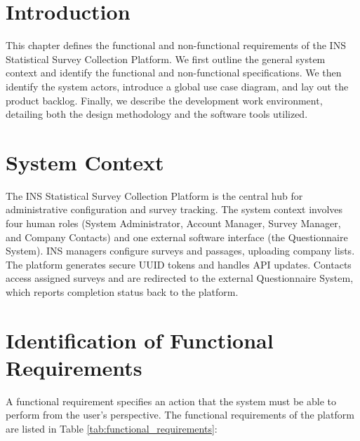 \documentclass[12pt,a4paper]{report}
\begin{document}
\section{Introduction}
This chapter defines the functional and non-functional requirements of the INS Statistical Survey Collection Platform. We first outline the general system context and identify the functional and non-functional specifications. We then identify the system actors, introduce a global use case diagram, and lay out the product backlog. Finally, we describe the development work environment, detailing both the design methodology and the software tools utilized.

\section{System Context}
The INS Statistical Survey Collection Platform is the central hub for administrative configuration and survey tracking. The system context involves four human roles (System Administrator, Account Manager, Survey Manager, and Company Contacts) and one external software interface (the Questionnaire System). 
INS managers configure surveys and passages, uploading company lists. The platform generates secure UUID tokens and handles API updates. Contacts access assigned surveys and are redirected to the external Questionnaire System, which reports completion status back to the platform.

\section{Identification of Functional Requirements}
A functional requirement specifies an action that the system must be able to perform from the user's perspective. The functional requirements of the platform are listed in Table \ref{tab:functional_requirements}:
\end{document}
